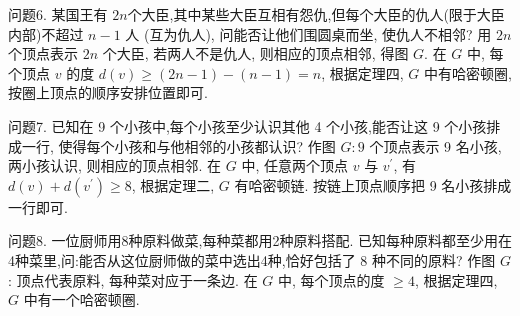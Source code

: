 问题6. 某国王有 $2n$个大臣,其中某些大臣互相有怨仇,但每个大臣的仇人(限于大臣内部)不超过 $n-1$ 人 (互为仇人), 问能否让他们围圆桌而坐, 使仇人不相邻?
用 $2 n$ 个顶点表示 $2 n$ 个大臣, 若两人不是仇人, 则相应的顶点相邻, 得图 $G$. 在 $G$ 中, 每个顶点 $v$ 的度 $d(v) \geqslant(2 n-1)-(n-1)=n$, 根据定理四, $G$ 中有哈密顿圈, 按圈上顶点的顺序安排位置即可.



问题7. 已知在 9 个小孩中,每个小孩至少认识其他 4 个小孩,能否让这 9 个小孩排成一行, 使得每个小孩和与他相邻的小孩都认识? 
作图 $G: 9$ 个顶点表示 9 名小孩, 两小孩认识, 则相应的顶点相邻.
在 $G$ 中, 任意两个顶点 $v$ 与 $v^{\prime}$, 有 $d(v)+d\left(v^{\prime}\right) \geqslant 8$, 根据定理二, $G$ 有哈密顿链.
按链上顶点顺序把 9 名小孩排成一行即可.



问题8. 一位厨师用8种原料做菜,每种菜都用2种原料搭配.
已知每种原料都至少用在4种菜里,问:能否从这位厨师做的菜中选出4种,恰好包括了 8 种不同的原料?
作图 $G$ : 顶点代表原料, 每种菜对应于一条边.
在 $G$ 中, 每个顶点的度 $\geqslant 4$, 根据定理四, $G$ 中有一个哈密顿圈.



